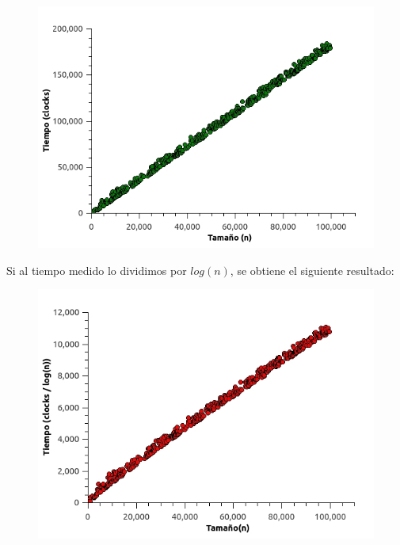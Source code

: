 \begin{figure}[H]
  \begin{center}
   \includegraphics[scale=0.66]{imagenes/grafico1-1.jpg}
  \end{center}
\end{figure}

Si al tiempo medido lo dividimos por $log(n)$, se obtiene el siguiente resultado: 

\begin{figure}[H]
  \begin{center}
   \includegraphics[scale=0.66]{imagenes/grafico1-2.jpg}
  \end{center}
\end{figure}

\newpage

